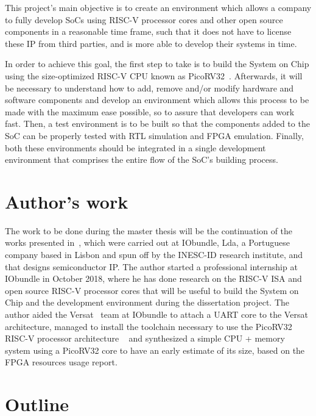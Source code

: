 This project's main objective is to create an environment which allows a company
to fully develop SoCs using RISC-V processor cores and other open source
components in a reasonable time frame, such that it does not have to license
these IP from third parties, and is more able to develop their systems in time.

In order to achieve this goal, the first step to take is to build the \socname
System on Chip using the size-optimized RISC-V CPU known as
PicoRV32~\cite{bib:picorv32}. Afterwards, it will be necessary to understand how
to add, remove and/or modify hardware and software components and develop an
environment which allows this process to be made with the maximum ease possible,
so to assure that developers can work fast. Then, a test environment is to be
built so that the components added to the SoC can be properly tested with RTL
simulation and FPGA emulation. Finally, both these environments should be
integrated in a single development environment that comprises the entire flow of
the SoC's building process.


\section{Author's work}
\label{section:authorswork}


The work to be done during the master thesis will be the continuation of the
works presented in~\cite{bib:blackbird,bib:warpbird}, which were carried out at
IObundle, Lda, a Portuguese company based in Lisbon and spun off by the INESC-ID
research institute, and that designs semiconductor IP. The author started a
professional internship at IObundle in October 2018, where he has done research
on the RISC-V ISA and open source RISC-V processor cores that will be useful to
build the \socname System on Chip and the development environment during
the dissertation project. The author aided the Versat~\cite{bib:versat} team at
IObundle to attach a UART core to the Versat architecture, managed to install
the toolchain necessary to use the PicoRV32 RISC-V processor architecture
~\cite{bib:picorv32} and synthesized a simple CPU + memory system using a
PicoRV32 core to have an early estimate of its size, based on the FPGA resources
usage report.



\section{Outline}
\label{section:outline}

